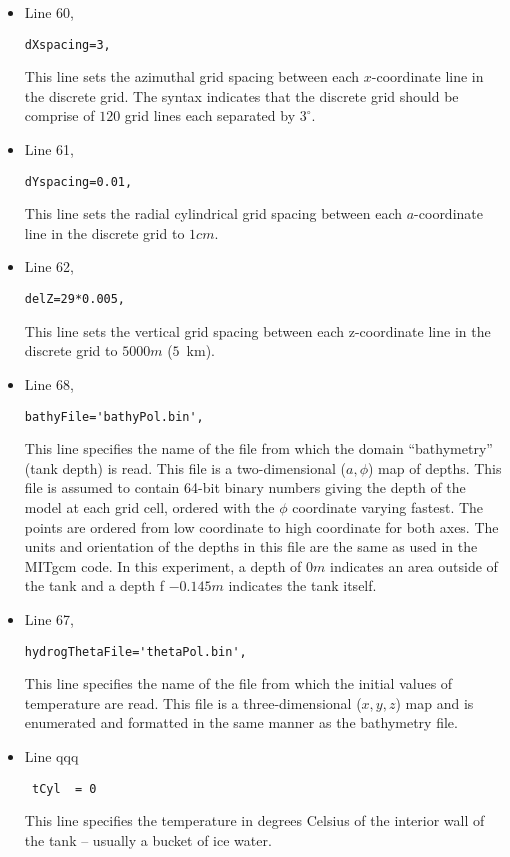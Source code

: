 \begin{itemize}
\item Line 60,
\begin{verbatim}
dXspacing=3,
\end{verbatim}
This line sets the azimuthal grid spacing between each $x$-coordinate line
in the discrete grid. The syntax indicates that the discrete grid
should be comprise of $120$ grid lines each separated by $3^{\circ}$.
                                                                                


\item Line 61,
\begin{verbatim}
dYspacing=0.01,
\end{verbatim}
This line sets the radial cylindrical grid spacing between each $a$-coordinate line
in the discrete grid to $1cm$.

\item Line 62,
\begin{verbatim}
delZ=29*0.005,
\end{verbatim}
This line sets the vertical grid spacing between each z-coordinate line
in the discrete grid to $5000m$ ($5$~km).

\item Line 68,
\begin{verbatim}
bathyFile='bathyPol.bin',
\end{verbatim}
This line specifies the name of the file from which the domain
``bathymetry'' (tank depth) is read. This file is a two-dimensional 
($a,\phi$) map of
depths. This file is assumed to contain 64-bit binary numbers 
giving the depth of the model at each grid cell, ordered with the $\phi$ 
coordinate varying fastest. The points are ordered from low coordinate
to high coordinate for both axes.  The units and orientation of the
depths in this file are the same as used in the MITgcm code. In this
experiment, a depth of $0m$ indicates an area outside of the tank
and a depth
f $-0.145m$ indicates the tank itself. 

\item Line 67,
\begin{verbatim}
hydrogThetaFile='thetaPol.bin',
\end{verbatim}
This line specifies the name of the file from which the initial values 
of temperature
are read. This file is a three-dimensional
($x,y,z$) map and is enumerated and formatted in the same manner as the 
bathymetry file. 

\item Line qqq
\begin{verbatim}
 tCyl  = 0
\end{verbatim}
This line specifies the temperature in degrees Celsius of the interior
wall of the tank -- usually a bucket of ice water.


\end{itemize}

